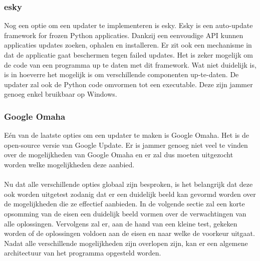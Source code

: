 \documentclass{article}
\begin{document}
\subsubsection{esky \citep{eskyMain}}
Nog een optie om een updater te implementeren is esky.
Esky is een auto-update framework for frozen Python applicaties.
Dankzij een eenvoudige API kunnen applicaties updates zoeken, ophalen en installeren.
Er zit ook een mechanisme in dat de applicatie gaat beschermen tegen failed updates.
Het is zeker mogelijk om de code van een programma up te daten met dit framework.
Wat niet duidelijk is, is in hoeverre het mogelijk is om verschillende componenten up-te-daten.
De updater zal ook de Python code omvormen tot een executable.
Deze zijn jammer genoeg enkel bruikbaar op Windows.

\subsubsection{Google Omaha \citep{omahaMain}}
E\'en van de laatste opties om een updater te maken is Google Omaha.
Het is de open-source versie van Google Update.
Er is jammer genoeg niet veel te vinden over de mogelijkheden van Google Omaha en er zal dus moeten uitgezocht worden welke mogelijkheden deze aanbied.

\paragraph{}
Nu dat alle verschillende opties globaal zijn besproken, is het belangrijk dat deze ook worden uitgetest zodanig dat er een duidelijk beeld kan gevormd worden over de mogelijkheden die ze effectief aanbieden.
In de volgende sectie zal een korte opsomming van de eisen een duidelijk beeld vormen over de verwachtingen van alle oplossingen.
Vervolgens zal er, aan de hand van een kleine test, gekeken worden of de oplossingen voldoen aan de eisen en naar welke de voorkeur uitgaat.
Nadat alle verschillende mogelijkheden zijn overlopen zijn, kan er een algemene architectuur van het programma opgesteld worden.
\end{document}
